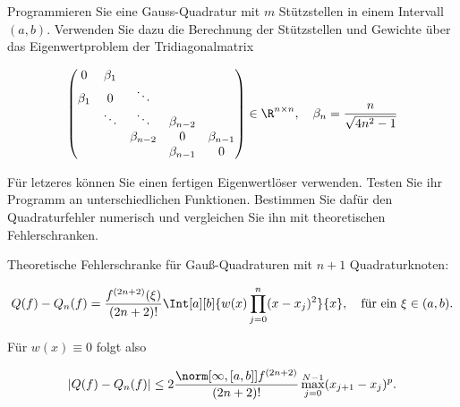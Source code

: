 
\begin{exercise}

Programmieren Sie eine Gauss-Quadratur mit $m$ Stützstellen in einem Intervall $(a, b)$.
Verwenden Sie dazu die Berechnung der Stützstellen und Gewichte über das Eigenwertproblem der Tridiagonalmatrix

\begin{align}
  \begin{pmatrix}
    0       & \beta_1 &             &             & \\
    \beta_1 & 0       & \ddots      &             & \\
            & \ddots  & \ddots      & \beta_{n-2} & \\
            &         & \beta_{n-2} & 0           & \beta_{n-1} \\
            &         &             & \beta_{n-1} & 0
  \end{pmatrix}
  \in
  \R^{n \times n},
  \quad
  \beta_n = \frac{n}{\sqrt{4n^2 -1}}
\end{align}

Für letzeres können Sie einen fertigen Eigenwertlöser verwenden.
Testen Sie ihr Programm an unterschiedlichen Funktionen.
Bestimmen Sie dafür den Quadraturfehler numerisch und vergleichen Sie ihn mit theoretischen Fehlerschranken.

\end{exercise}


\begin{solution}

Theoretische Fehlerschranke für Gauß-Quadraturen mit $n + 1$ Quadraturknoten:

\begin{align*}
  Q(f) - Q_n(f)
  =
  \frac
  {
    f^{(2n + 2)}(\xi)
  }{
    (2n + 2)!
  }
  \Int[a][b]
  {
    w(x)
    \prod_{j=0}^n
    (x - x_j)^2
  }{x},
  \quad
  \text{für ein}~
  \xi \in (a, b).
\end{align*}

Für $w(x) \equiv 0$ folgt also

\begin{align*}
  |Q(f) - Q_n(f)|
  \leq
  2 \frac
  {
    \norm
    [{\infty, [a, b]}]
    {f^{(2n + 2)}}
  }
  {
    (2n + 2)!
  }
  \max_{j=0}^{N-1}
  (x_{j+1} - x_j)^p.
\end{align*}

\end{solution}

